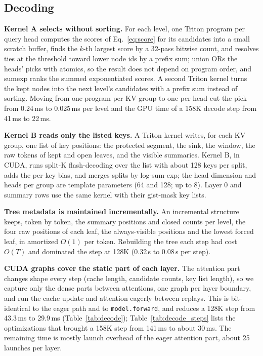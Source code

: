 \documentclass[10pt,twocolumn]{article}
\newcommand{\para}[1]{\noindent\textbf{#1}\hspace{0.5em}}
\begin{document}
\subsection{Decoding}
\label{sec:decode}

\para{Kernel A selects without sorting.}
For each level, one Triton \citep{tillet2019triton} program per query head computes the scores
of Eq.~\eqref{eq:score} for its candidates into a small scratch buffer, finds the $k$-th largest
score by a 32-pass bitwise count, and resolves ties at the threshold toward lower node ids by
a prefix sum; union ORs the heads' picks with atomics, so the result does not depend on
program order, and sumexp ranks the summed exponentiated scores. A second Triton kernel turns
the kept nodes into the next level's candidates with a prefix sum instead of sorting. Moving
from one program per KV group to one per head cut the pick from 0.24\,ms to 0.025\,ms per level
and the GPU time of a 158K decode step from 41\,ms to 22\,ms.

\para{Kernel B reads only the listed keys.}
A Triton kernel writes, for each KV group, one list of key positions: the protected segment,
the sink, the window, the raw tokens of kept and open leaves, and the visible summaries.
Kernel B, in CUDA, runs split-K flash-decoding \citep{dao2023flashdecoding} over the list with
about 128 keys per split, adds the per-key bias, and merges splits by log-sum-exp; the head
dimension and heads per group are template parameters (64 and 128; up to 8). Layer 0 and
summary rows use the same kernel with their gist-mask key lists.

\para{Tree metadata is maintained incrementally.}
An incremental structure keeps, token by token, the summary positions and closed counts per
level, the four raw positions of each leaf, the always-visible positions and the lowest forced
leaf, in amortized $O(1)$ per token. Rebuilding the tree each step had cost $O(T)$ and
dominated the step at 128K (0.32\,s to 0.08\,s per step).

\para{CUDA graphs cover the static part of each layer.}
The attention part changes shape every step (cache length, candidate counts, key list
length), so we capture only the dense parts between attentions, one graph per layer boundary,
and run the cache update and attention eagerly between replays. This is bit-identical to the
eager path and to \texttt{model.forward}, and reduces a 128K step from 43.3\,ms to 29.9\,ms
(Table~\ref{tab:decode}); Table~\ref{tab:decode_steps} lists the optimizations that brought a
158K step from 141\,ms to about 30\,ms. The remaining time is mostly launch overhead of the
eager attention part, about 25 launches per layer.
\end{document}
